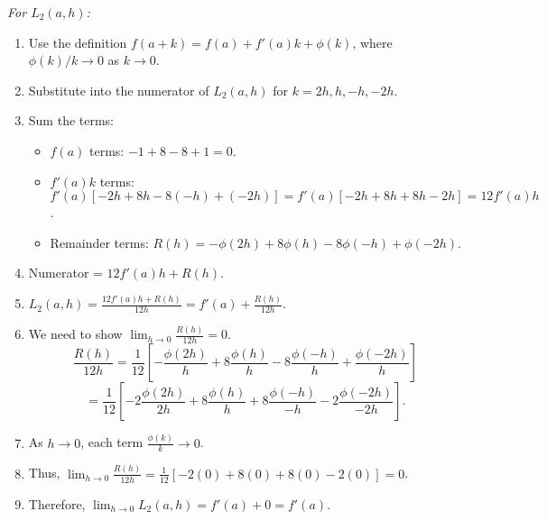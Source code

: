 \documentclass{article}
\begin{document}
\textit{For \(L_2(a,h)\):}
\begin{enumerate}
    \item Use the definition \(f(a+k) = f(a) + f'(a)k + \phi(k)\), where \(\phi(k)/k \to 0\) as \(k \to 0\).
    \item Substitute into the numerator of \(L_2(a,h)\) for \(k = 2h, h, -h, -2h\).
    \item Sum the terms:
    \begin{itemize}
        \item \(f(a)\) terms: \(-1+8-8+1 = 0\).
        \item \(f'(a)k\) terms: \(f'(a)[-2h + 8h - 8(-h) + (-2h)] = f'(a)[-2h + 8h + 8h - 2h] = 12 f'(a)h\).
        \item Remainder terms: \(R(h) = -\phi(2h) + 8\phi(h) - 8\phi(-h) + \phi(-2h)\).
    \end{itemize}
    \item Numerator = \(12 f'(a)h + R(h)\).
    \item \(L_2(a,h) = \frac{12 f'(a)h + R(h)}{12h} = f'(a) + \frac{R(h)}{12h}\).
    \item We need to show \(\lim_{h \to 0} \frac{R(h)}{12h} = 0\).
    \[ \frac{R(h)}{12h} = \frac{1}{12} \left[ - \frac{\phi(2h)}{h} + 8 \frac{\phi(h)}{h} - 8 \frac{\phi(-h)}{h} + \frac{\phi(-2h)}{h} \right] \]
    \[ = \frac{1}{12} \left[ -2 \frac{\phi(2h)}{2h} + 8 \frac{\phi(h)}{h} + 8 \frac{\phi(-h)}{-h} - 2 \frac{\phi(-2h)}{-2h} \right]. \]
    \item As \(h \to 0\), each term \(\frac{\phi(k)}{k} \to 0\).
    \item Thus, \(\lim_{h \to 0} \frac{R(h)}{12h} = \frac{1}{12} [-2(0) + 8(0) + 8(0) - 2(0)] = 0\).
    \item Therefore, \(\lim_{h \to 0} L_2(a,h) = f'(a) + 0 = f'(a)\).
\end{enumerate}
\end{document}
